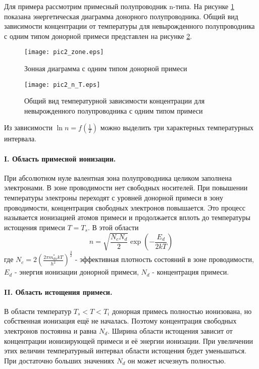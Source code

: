 Для примера рассмотрим примесный полупроводник n-типа. На рисунке \ref{pic2_zone} показана энергетическая диаграмма донорного полупроводника. Общий вид зависимости концентрации от температуры для невырожденного полупроводника с одним типом донорной примеси представлен на рисунке \ref{pic2_n_T}.

\begin{figure}[h!]\centering
\texttt{[image: pic2\_zone.eps]}
\caption{Зонная диаграмма с одним типом донорной примеси}
\label{pic2_zone}
\end{figure}

\begin{figure}[h!]\centering
\texttt{[image: pic2\_n\_T.eps]}
\caption{Общий вид температурной зависимости концентрации для невырожденного полупроводника с одним типом примеси}
\label{pic2_n_T}
\end{figure}

Из зависимости $\ln n = f(\frac{1}{T})$ можно выделить три характерных температурных интервала.

\paragraph{I. Область примесной ионизации.}
При абсолютном нуле валентная зона полупроводника целиком заполнена электронами. В зоне проводимости нет свободных носителей. При повышении температуры электроны переходят с уровней донорной примеси в зону проводимости, концентрация свободных электронов повышается. Это процесс называется ионизацией атомов примеси и продолжается вплоть до температуры истощения примеси $T = T_{s}$. В этой области
\begin{equation}
n = \sqrt{\frac{N_{c}N_{d}}{2}} \exp{\left( -\frac{E_{d}}{2 k T} \right)}
\label{eq2_n_T}
\end{equation}
где $N_{c} = 2 \left( \frac{2 \pi m_{dn}^{*} k T}{h^2} \right) ^ \frac{3}{2}$ - эффективная плотность состояний в зоне проводимости, $E_{d}$ - энергия ионизации донорной примеси, $N_{d}$ - концентрация примеси.

\paragraph{II. Область истощения примеси.}
В области температур $T_{s} < T < T_{i}$ донорная примесь полностью ионизована, но собственная ионизация ещё не началась. Поэтому концентрация свободных электронов постоянна и равна $N_{d}$.
Ширина области истощения зависит от концентрации ионизирующей примеси и её энергии ионизации. При увеличении этих величин температурный интервал области истощения будет уменьшаться. При достаточно больших значениях $N_{d}$ он может исчезнуть полностью.

